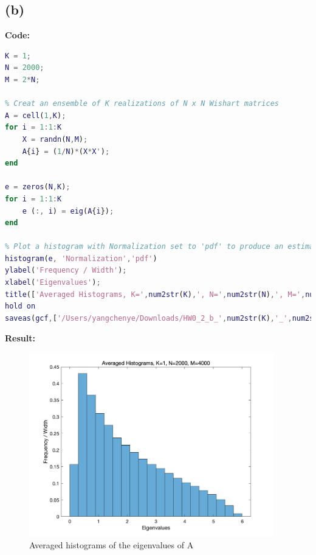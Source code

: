 \documentclass[twoside]{homework}
\begin{document}
\subsection*{(b)}
\textbf{Code:}
\begin{lstlisting}[language={Matlab}]
K = 1;
N = 2000;
M = 2*N;

% Creat an ensemble of K realizations of N x N Wishart matrices
A = cell(1,K);
for i = 1:1:K
    X = randn(N,M);
    A{i} = (1/N)*(X*X');
end

e = zeros(N,K);
for i = 1:1:K
    e (:, i) = eig(A{i});
end

% Plot a histogram with Normalization set to 'pdf' to produce an estimation of the probability density function.
histogram(e, 'Normalization','pdf')
ylabel('Frequency / Width');
xlabel('Eigenvalues');
title(['Averaged Histograms, K=',num2str(K),', N=',num2str(N),', M=',num2str(M)]);
hold on
saveas(gcf,['/Users/yangchenye/Downloads/HW0_2_b_',num2str(K),'_',num2str(N),'_',num2str(M),'.png'])
\end{lstlisting}
\textbf{Result:}
\begin{figure}[!h]
\begin{center}
\includegraphics[width=0.95\textwidth]{HW0_2_b_1_2000_4000.png}
\end{center}
\caption{Averaged histograms of the eigenvalues of A}
\label{fig:HW0_2_b}
\end{figure}
\end{document}

